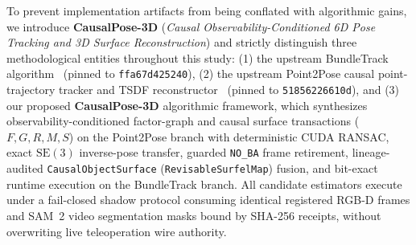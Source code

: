 \documentclass[10pt,journal]{IEEEtran}
\begin{document}
To prevent implementation artifacts from being conflated with algorithmic gains, we introduce \textbf{CausalPose-3D} (\emph{Causal Observability-Conditioned 6D Pose Tracking and 3D Surface Reconstruction}) and strictly distinguish three methodological entities throughout this study: (1) the upstream BundleTrack algorithm~\cite{bundletrack} (pinned to \texttt{ffa67d425240}), (2) the upstream Point2Pose causal point-trajectory tracker and TSDF reconstructor~\cite{point2pose} (pinned to \texttt{51856226610d}), and (3) our proposed \textbf{CausalPose-3D} algorithmic framework, which synthesizes observability-conditioned factor-graph and causal surface transactions ($F,G,R,M,S$) on the Point2Pose branch with deterministic CUDA RANSAC, exact $\mathrm{SE}(3)$ inverse-pose transfer, guarded \texttt{NO\_BA} frame retirement, lineage-audited \texttt{CausalObjectSurface} (\texttt{RevisableSurfelMap}) fusion, and bit-exact runtime execution on the BundleTrack branch. All candidate estimators execute under a fail-closed shadow protocol consuming identical registered RGB-D frames and SAM~2 video segmentation masks bound by SHA-256 receipts, without overwriting live teleoperation wire authority.
\end{document}
